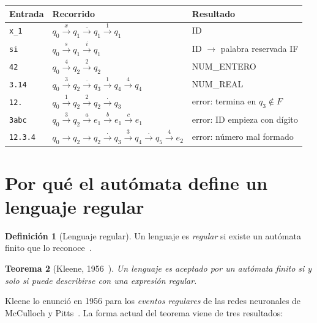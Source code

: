 \documentclass[11pt, a4paper]{article}
\theoremstyle{plain}
\newtheorem{teorema}{Teorema}
\theoremstyle{definition}
\newtheorem{definicion}[teorema]{Definición}
\newcommand{\lex}[1]{\texttt{#1}}             %
\begin{document}
\begin{center}
\begin{tabular}{l l l}
  \toprule
  Entrada & Recorrido & Resultado \\
  \midrule
  \lex{x\_1}    & $q_0 \xrightarrow{x} q_1 \xrightarrow{\texttt{\_}} q_1 \xrightarrow{1} q_1$ & \textsf{ID} \\
  \lex{si}      & $q_0 \xrightarrow{s} q_1 \xrightarrow{i} q_1$ & \textsf{ID} $\to$ palabra reservada \textsf{IF} \\
  \lex{42}      & $q_0 \xrightarrow{4} q_2 \xrightarrow{2} q_2$ & \textsf{NUM\_ENTERO} \\
  \lex{3.14}    & $q_0 \xrightarrow{3} q_2 \xrightarrow{\texttt{.}} q_3 \xrightarrow{1} q_4 \xrightarrow{4} q_4$ & \textsf{NUM\_REAL} \\
  \lex{12.}     & $q_0 \xrightarrow{1} q_2 \xrightarrow{2} q_2 \xrightarrow{\texttt{.}} q_3$ & error: termina en $q_3 \notin F$ \\
  \lex{3abc}    & $q_0 \xrightarrow{3} q_2 \xrightarrow{a} e_1 \xrightarrow{b} e_1 \xrightarrow{c} e_1$ & error: ID empieza con dígito \\
  \lex{12.3.4}  & $q_0 \to q_2 \to q_2 \xrightarrow{\texttt{.}} q_3 \xrightarrow{3} q_4 \xrightarrow{\texttt{.}} q_5 \xrightarrow{4} e_2$ & error: número mal formado \\
  \bottomrule
\end{tabular}
\end{center}

\section{Por qué el autómata define un lenguaje regular}

\begin{definicion}[Lenguaje regular]
Un lenguaje es \emph{regular} si existe un autómata finito que lo reconoce~\cite{sipser}.
\end{definicion}

\begin{teorema}[Kleene, 1956~\cite{kleene}]
Un lenguaje es aceptado por un autómata finito si y solo si puede describirse con una
expresión regular.
\end{teorema}

Kleene lo enunció en 1956 para los \emph{eventos regulares} de las redes neuronales de
McCulloch y Pitts~\cite{kleene}. La forma actual del teorema viene de tres resultados:
\end{document}
